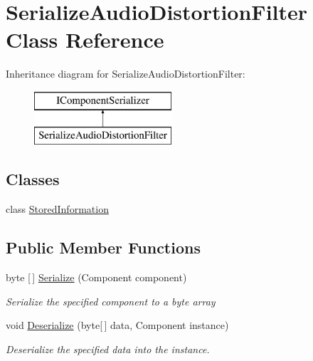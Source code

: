 \hypertarget{class_serialize_audio_distortion_filter}{}\section{Serialize\+Audio\+Distortion\+Filter Class Reference}
\label{class_serialize_audio_distortion_filter}
Inheritance diagram for Serialize\+Audio\+Distortion\+Filter\+:\begin{figure}[H]
\begin{center}
\leavevmode
\includegraphics[height=2.000000cm]{class_serialize_audio_distortion_filter}
\end{center}
\end{figure}
\subsection*{Classes}
\begin{DoxyCompactItemize}
\item 
class \hyperlink{class_serialize_audio_distortion_filter_1_1_stored_information}{Stored\+Information}
\end{DoxyCompactItemize}
\subsection*{Public Member Functions}
\begin{DoxyCompactItemize}
\item 
byte \mbox{[}$\,$\mbox{]} \hyperlink{class_serialize_audio_distortion_filter_a035cc0e02b72b00fdc39d0fbfe5c2b96}{Serialize} (Component component)
\begin{DoxyCompactList}\small\item\em Serialize the specified component to a byte array \end{DoxyCompactList}\item 
void \hyperlink{class_serialize_audio_distortion_filter_ac48265d0fbc0547e5d316f09828ca086}{Deserialize} (byte\mbox{[}$\,$\mbox{]} data, Component instance)
\begin{DoxyCompactList}\small\item\em Deserialize the specified data into the instance. \end{DoxyCompactList}\end{DoxyCompactItemize}


